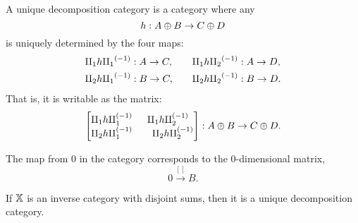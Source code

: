 \begin{definition}\label{def:unique_decomposition_category}
A unique decomposition category\cite{haghverdi:2000phd} is a category where any
\[
  h:A\oplus B \to C\oplus D
\]
is uniquely determined by the four maps:
\begin{alignat*}{2}
  \amalg_{1}  h  {\amalg_{1}}^{(-1)} &: A \to C, & \quad \amalg_{1}  h  {\amalg_{2}}^{(-1)} &: A \to D,\\
  \amalg_{2}  h  {\amalg_{1}}^{(-1)} &: B \to C, & \quad \amalg_{2}  h  {\amalg_{2}}^{(-1)} &: B \to D.
\end{alignat*}
That is, it is writable as the matrix:
\[
  \begin{bmatrix}
    \amalg_{1}  h  \amalg_{1}^{(-1)} & \amalg_{1}  h  \amalg_{2}^{(-1)}\\
    \amalg_{2}  h  \amalg_{1}^{(-1)} &\quad \amalg_{2}  h  \amalg_{2}^{(-1)}
  \end{bmatrix}:
  A\oplus B \to C\oplus D.
\]

The map from $0$ in the category corresponds to the $0$-dimensional matrix,
\[
  0\xrightarrow{[]}B.
\]
\end{definition}

\begin{corollary}\label{cor:disjoint_sum_category_is_udc}
  If $\mathbb{X}$ is an inverse category with disjoint sums, then it is a unique decomposition category.
\end{corollary}



